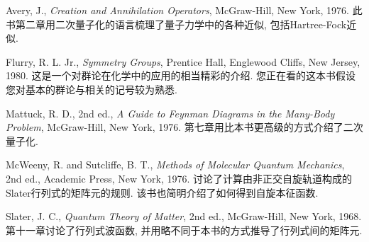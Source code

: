 \indent Avery, J., \textit{Creation and Annihilation Operators}, McGraw-Hill, New York, 1976. 此书第二章用二次量子化的语言梳理了量子力学中的各种近似, 包括Hartree-Fock近似.

Flurry, R. L. Jr., \textit{Symmetry Groups}, Prentice Hall, Englewood Cliffs, New Jersey, 1980. 这是一个对群论在化学中的应用的相当精彩的介绍. 您正在看的这本书假设您对基本的群论与相关的记号较为熟悉.

Mattuck, R. D., 2nd ed., \textit{A Guide to Feynman Diagrams in the Many-Body Problem}, McGraw-Hill, New York, 1976. 第七章用比本书更高级的方式介绍了二次量子化.

McWeeny, R. and Sutcliffe, B. T., \textit{Methods of Molecular Quantum Mechanics}, 2nd ed., Academic Press, New York, 1976. 讨论了计算由非正交自旋轨道构成的Slater行列式的矩阵元的规则. 该书也简明介绍了如何得到自旋本征函数.

Slater, J. C., \textit{Quantum Theory of Matter}, 2nd ed., McGraw-Hill, New York, 1968. 第十一章讨论了行列式波函数, 并用略不同于本书的方式推导了行列式间的矩阵元.
